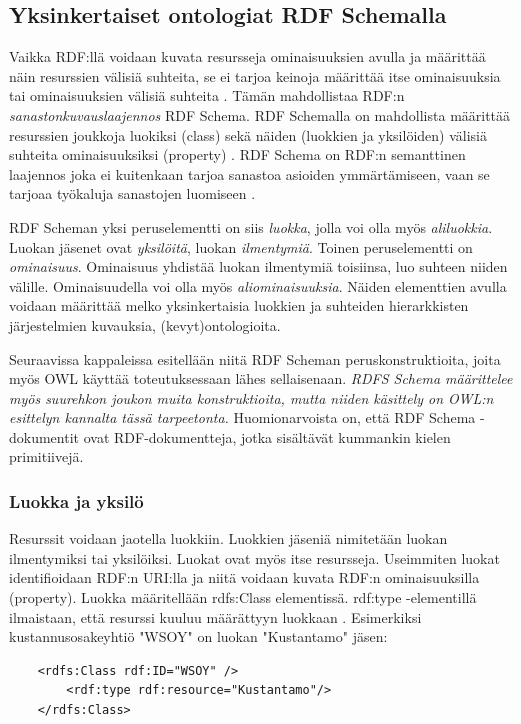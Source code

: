 \documentclass[finnish]{tktltiki2}
\theoremstyle{definition}
\theoremstyle{remark}
\begin{document}
\subsection{Yksinkertaiset ontologiat RDF Schemalla}

Vaikka RDF:llä voidaan kuvata resursseja ominaisuuksien avulla ja määrittää näin resurssien välisiä suhteita, se ei tarjoa keinoja määrittää itse ominaisuuksia tai
ominaisuuksien välisiä suhteita \cite{RDFS}. Tämän mahdollistaa RDF:n \textit{sanastonkuvauslaajennos}
RDF Schema. RDF Schemalla on mahdollista määrittää resurssien joukkoja luokiksi (class) sekä näiden (luokkien ja yksilöiden) välisiä suhteita ominaisuuksiksi (property) \cite{RDFS}. 
RDF Schema on RDF:n semanttinen laajennos joka ei kuitenkaan tarjoa sanastoa asioiden ymmärtämiseen, vaan se tarjoaa työkaluja sanastojen luomiseen \cite{RDFS}. 

RDF Scheman yksi peruselementti on siis \textit{luokka}, jolla voi olla myös \textit{aliluokkia}. Luokan jäsenet ovat \textit{yksilöitä}, luokan \textit{ilmentymiä}. Toinen peruselementti on \textit{ominaisuus}. Ominaisuus yhdistää luokan 
ilmentymiä toisiinsa, luo suhteen niiden välille. Ominaisuudella voi olla myös \textit{aliominaisuuksia}. Näiden elementtien avulla voidaan määrittää melko yksinkertaisia luokkien ja suhteiden hierarkkisten järjestelmien kuvauksia, (kevyt)ontologioita.  

Seuraavissa kappaleissa esitellään niitä RDF Scheman peruskonstruktioita, 
joita myös OWL käyttää toteutuksessaan lähes sellaisenaan. \emph{RDFS Schema määrittelee myös suurehkon joukon muita konstruktioita, mutta niiden käsittely on OWL:n esittelyn kannalta tässä tarpeetonta.} 
Huomionarvoista on, että RDF Schema -dokumentit ovat RDF-dokumentteja, jotka sisältävät kummankin kielen primitiivejä.

\subsubsection{Luokka ja yksilö}
Resurssit voidaan jaotella luokkiin. Luokkien jäseniä nimitetään luokan ilmentymiksi tai yksilöiksi\cite{RDFS}. Luokat ovat myös itse resursseja. Useimmiten luokat identifioidaan RDF:n URI:lla ja niitä voidaan kuvata RDF:n ominaisuuksilla (property). Luokka määritellään rdfs:Class elementissä. rdf:type -elementillä ilmaistaan, että resurssi kuuluu määrättyyn luokkaan \cite{RDFS}. Esimerkiksi kustannusosakeyhtiö "WSOY" on luokan "Kustantamo" jäsen:
\begin{verbatim}
    <rdfs:Class rdf:ID="WSOY" />
        <rdf:type rdf:resource="Kustantamo"/>
    </rdfs:Class>
\end{verbatim} 
\end{document}
